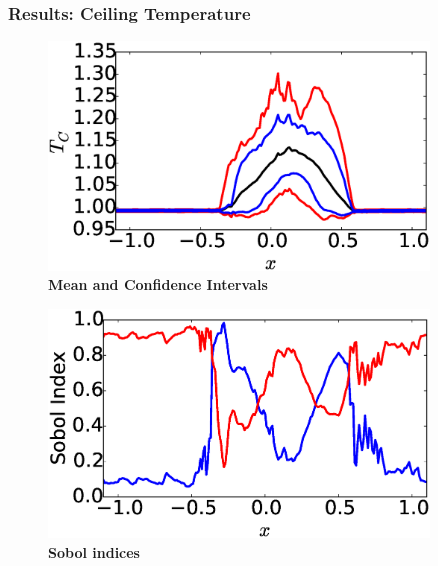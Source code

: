 \documentclass[9pt]{beamer}
\begin{document}
\begin{frame}
\frametitle{Results: Ceiling Temperature}
\label{sec-7-5}


\centering
\begin{minipage}[b]{0.45\linewidth}
\begin{figure}[ht]
\includegraphics[width=0.9\textwidth]{CeilingTempMeanPercentiles} \\
\textbf{Mean and Confidence Intervals}
\end{figure}
\end{minipage}
\begin{minipage}[b]{0.45\linewidth}
\begin{figure}[ht]
\includegraphics[width=0.9\textwidth]{SobolIndexCeilingTemp} \\
\textbf{Sobol indices}
\end{figure}
\end{minipage}


\end{frame}
\end{document}
